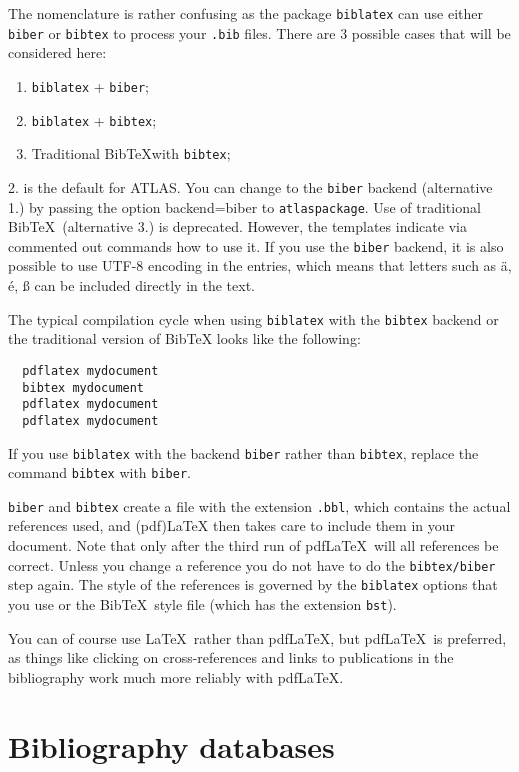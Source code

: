 \documentclass[UKenglish,texlive=2013]{latex/atlasdoc}
\newcommand*{\BibTeX}{Bib\TeX}
\newcommand{\File}[1]{\texttt{#1}\xspace}
\newcommand{\Option}[1]{\textsf{#1}\xspace}
\newcommand{\Package}[1]{\texttt{#1}\xspace}
\begin{document}
The nomenclature is rather confusing as the package \Package{biblatex} can use
either \texttt{biber} or \texttt{bibtex} to process your \texttt{.bib} files.
There are 3 possible cases that will be considered here:
\begin{enumerate}\setlength{\itemsep}{0pt}\setlength{\parskip}{0pt}
  \item \texttt{biblatex} + \texttt{biber};
  \item \texttt{biblatex} + \texttt{bibtex};
  \item Traditional \BibTeX with \texttt{bibtex};
\end{enumerate}
2. is the default for ATLAS. You can change to the \texttt{biber} backend (alternative 1.) by passing the option
\Option{backend=biber} to \Package{atlaspackage}. 
Use of traditional \BibTeX\ (alternative 3.) is deprecated.
However, the templates indicate via commented out commands how to use it.
If you use the \texttt{biber} backend, it is also possible to use UTF-8 encoding in the entries, which means that letters such as
ä, é, ß can be included directly in the text.

The typical compilation cycle when using \Package{biblatex} with the \texttt{bibtex} backend 
or the traditional version of \BibTeX{} looks like the following:
%
\begin{verbatim}
  pdflatex mydocument
  bibtex mydocument
  pdflatex mydocument
  pdflatex mydocument
\end{verbatim}
If you use \Package{biblatex} with the backend \Package{biber} rather than \Package{bibtex}, replace the command
\texttt{bibtex} with \texttt{biber}.

\texttt{biber} and \texttt{bibtex} create a file with the extension \texttt{.bbl}, which
contains the actual references used, and (pdf)\LaTeX{} then takes care to include them in your document. 
Note that only after the third run of pdf\LaTeX\ will all references be correct. 
Unless you change a reference you do not have to do the \texttt{bibtex/biber} step again.
The style of the references is governed by the \Package{biblatex} options that you
use or the \BibTeX\ style file (which has the extension \File{bst}).

You can of course use \LaTeX\ rather than pdf\LaTeX, but pdf\LaTeX\ is preferred,
as things like clicking on cross-references and links to publications in the bibliography
work much more reliably with pdf\LaTeX.


\section{Bibliography databases}
\end{document}
